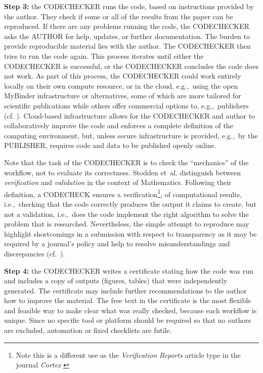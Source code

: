 \documentclass[12pt]{article}
\begin{document}
\textbf{Step 3:} the CODECHECKER runs the code, based on instructions provided by
the author. They check if some or all of the results from the paper can be
reproduced. If there are
any problems running the code, the CODECHECKER asks the AUTHOR for help,
updates, or further documentation.
The burden to provide reproducible material lies with the author.
The CODECHECKER then tries to run the code again.
This process iterates until either the CODECHECKER is successful,
or the CODECHECKER concludes the code does not work.
As part of this process, the CODECHECKER could work entirely
locally on their own compute resource, or in the cloud, e.g.,~using the open
MyBinder infrastructure \cite{jupyter_binder_2018} or alternatives, some of which
are more tailored for scientific publications while others offer commercial
options to, e.g.,~publishers (cf. \cite{konkol_publishing_2020}).
Cloud-based 
infrastructure allows for the CODECHECKER and author to collaboratively improve
the code and enforces a complete definition of the computing environment,
but, unless secure infrastructure is provided, e.g.,~by the PUBLISHER,
requires code and data to be published openly online.

Note that the task of the CODECHECKER is to check the ``mechanics'' of the
workflow, not to evaluate its correctness. 
Stodden et~al. \cite{stodden_setting_2013} distinguish between \emph{verification}
and \emph{validation}
in the context of Mathematics. Following their definition, a CODECHECK
ensures a verification\footnote{Note this is a different use as the
\emph{Verification Reports} 
article type in the journal \emph{Cortex} \cite{chambers_verification_2020}},
of computational results, i.e.,~checking that the code correctly produces the 
output it claims to create, but not a validation, i.e.,~does the code implement
the right algorithm to solve the problem that is researched.
Nevertheless, the simple attempt to reproduce may highlight shortcomings in
a submission with respect to transparency as it may be required by a journal's
policy and help to resolve misunderstandings and discrepancies
(cf.~\cite{christian_journal_2020}).

\textbf{Step 4:} the CODECHECKER writes a certificate stating how the code was
run and includes a copy of outputs (figures, tables) that were
independently generated. The certificate may include further recommendations to
the author how to improve the material.
The free text in the certificate is the most flexible and feasible way to 
make clear what was really checked, because each workflow is unique.
Since no specific tool or platform should be required so that no authors are
excluded, automation or fixed checklists are futile.
\end{document}
